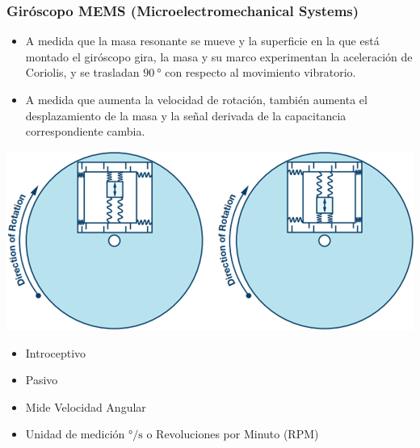 \begin{frame}
    \frametitle{Giróscopo MEMS (Microelectromechanical Systems)}
    \scriptsize
        
    \begin{itemize}
        \item A medida que la masa resonante se mueve y la superficie en la que está montado el giróscopo gira, la masa y su marco experimentan la aceleración de Coriolis, y se trasladan $\SI{90}{\degree}$ con respecto al movimiento vibratorio.
        
        \item A medida que aumenta la velocidad de rotación, también aumenta el desplazamiento de la masa y la señal derivada de la capacitancia correspondiente cambia.
    \end{itemize}
    
    \begin{center}
        \includegraphics[width=0.5\columnwidth]{images/gyroscope_mems_3.png}
    \end{center}
    
    \begin{itemize}
        \item Introceptivo
        \item Pasivo
        \item Mide Velocidad Angular
        \item Unidad de medición $\si{\degree\per\second}$ o Revoluciones por Minuto (RPM)
    \end{itemize}

\end{frame}

